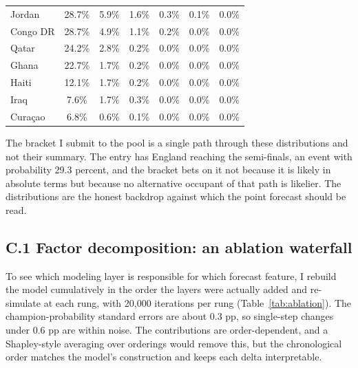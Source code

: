 \documentclass[11pt,letterpaper]{article}
\begin{document}
\begin{table}[p]
\begin{tabular}{lcccccc}
Jordan                 & 28.7\% &  5.9\% &  1.6\% &  0.3\% &  0.1\% &  0.0\% \\
Congo DR               & 28.7\% &  4.9\% &  1.1\% &  0.2\% &  0.0\% &  0.0\% \\
Qatar                  & 24.2\% &  2.8\% &  0.2\% &  0.0\% &  0.0\% &  0.0\% \\
Ghana                  & 22.7\% &  1.7\% &  0.2\% &  0.0\% &  0.0\% &  0.0\% \\
Haiti                  & 12.1\% &  1.7\% &  0.2\% &  0.0\% &  0.0\% &  0.0\% \\
Iraq                   &  7.6\% &  1.7\% &  0.3\% &  0.0\% &  0.0\% &  0.0\% \\
Curaçao                &  6.8\% &  0.6\% &  0.1\% &  0.0\% &  0.0\% &  0.0\% \\
\bottomrule
\end{tabular}
\end{table}

The bracket I submit to the pool is a single path through these distributions and not their summary. The entry has England reaching the semi-finals, an event with probability 29.3 percent, and the bracket bets on it not because it is likely in absolute terms but because no alternative occupant of that path is likelier. The distributions are the honest backdrop against which the point forecast should be read.

\subsection*{C.1 \quad Factor decomposition: an ablation waterfall}

To see which modeling layer is responsible for which forecast feature, I rebuild the model cumulatively in the order the layers were actually added and re-simulate at each rung, with 20{,}000 iterations per rung (Table~\ref{tab:ablation}). The champion-probability standard errors are about 0.3 pp, so single-step changes under 0.6 pp are within noise. The contributions are order-dependent, and a Shapley-style averaging over orderings would remove this, but the chronological order matches the model's construction and keeps each delta interpretable.
\end{document}

